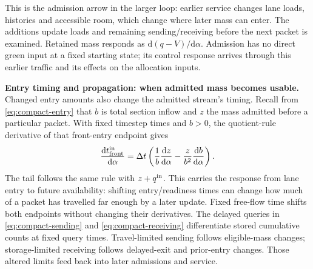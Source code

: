 \documentclass[10pt,a4paper]{article}
\newcommand{\rev}[1]{{\color{revisionred}#1}}
\begin{document}
This is the admission arrow in the larger loop: earlier service changes
lane loads, histories and accessible room, which change where later mass
can enter. The additions update loads and remaining sending/receiving
before the next packet is examined. Retained mass responds as
$\mathrm d(q-V)/\mathrm d\alpha$. Admission has no direct green input
at a fixed starting state; its control response arrives through this
earlier traffic and its effects on the allocation inputs.

\textbf{Entry timing and propagation: when admitted mass becomes usable.}
Changed entry amounts also change the admitted stream's timing.
Recall from \eqref{eq:compact-entry} that $b$ is total section inflow
and $z$ the mass admitted before a particular packet. With fixed timestep
times and $b>0$,
\rev{the quotient-rule derivative of that front-entry endpoint gives}
\begin{equation}
 \frac{\mathrm dt^{\rm in}_{\rm front}}{\mathrm d\alpha}
 =\Delta t\left(\frac1b\frac{\mathrm dz}{\mathrm d\alpha}
       -\frac z{b^2}\frac{\mathrm db}{\mathrm d\alpha}\right).
 \label{eq:compact-entry-derivative}
\end{equation}
The tail follows the same rule with $z+q^{\rm in}$.
This carries the response from lane entry to future availability:
shifting entry/readiness times can change how much of a packet has
travelled far enough by a later update. Fixed free-flow time shifts both
endpoints without changing their derivatives.
The delayed queries in \eqref{eq:compact-sending} and
\eqref{eq:compact-receiving} differentiate stored cumulative counts at
fixed query times. Travel-limited sending follows eligible-mass changes;
storage-limited receiving follows delayed-exit and prior-entry changes.
Those altered limits feed back into later admissions and service.
\end{document}
